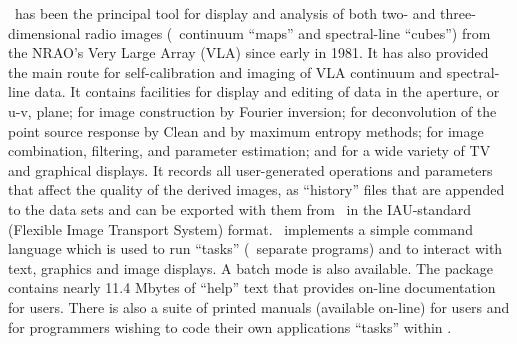     \AIPS\ has been the principal tool for display and analysis of both
two- and three-dimensional radio images (\ie\ continuum ``maps'' and
spectral-line ``cubes'') from the NRAO's Very Large Array (VLA) since
early in 1981.  It has also provided the main route for
self-calibration and imaging of VLA continuum and spectral-line data.
It contains facilities for display and editing of data in the
aperture, or u-v, plane; for image construction by Fourier inversion;
for deconvolution of the point source response by Clean and by maximum
entropy methods; for image combination, filtering, and parameter
estimation; and for a wide variety of TV and graphical displays.  It
records all user-generated operations and parameters that affect the
quality of the derived images, as ``history'' files that are appended
to the data sets and can be exported with them from \AIPS\ in the
IAU-standard  (Flexible Image Transport System) format.
\AIPS\ implements a simple command language which is used to run
``tasks'' (\ie\ separate programs) and to interact with text, graphics
and image displays.  A batch mode is also available.  The package
contains nearly 11.4 Mbytes of ``help'' text that provides on-line
documentation for users.  There is also a suite of printed manuals
(available on-line) for users and for programmers wishing to code
their own applications ``tasks'' within \AIPS\@.

